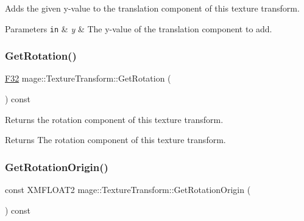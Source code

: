 Adds the given y-\/value to the translation component of this texture transform.


\begin{DoxyParams}[1]{Parameters}
\mbox{\tt in}  & {\em y} & The y-\/value of the translation component to add. \\
\hline
\end{DoxyParams}
\hypertarget{classmage_1_1_texture_transform_ade561a56fa2e80b70c74620277a9afa1}{}\label{classmage_1_1_texture_transform_ade561a56fa2e80b70c74620277a9afa1} 
\subsubsection{\texorpdfstring{Get\+Rotation()}{GetRotation()}}
{\footnotesize\ttfamily \hyperlink{namespacemage_aa97e833b45f06d60a0a9c4fc22ae02c0}{F32} mage\+::\+Texture\+Transform\+::\+Get\+Rotation (\begin{DoxyParamCaption}{ }\end{DoxyParamCaption}) const\hspace{0.3cm}{\ttfamily [noexcept]}}

Returns the rotation component of this texture transform.

\begin{DoxyReturn}{Returns}
The rotation component of this texture transform. 
\end{DoxyReturn}
\hypertarget{classmage_1_1_texture_transform_ad23596d5d9bc99978c3bc0f54c280dec}{}\label{classmage_1_1_texture_transform_ad23596d5d9bc99978c3bc0f54c280dec} 
\subsubsection{\texorpdfstring{Get\+Rotation\+Origin()}{GetRotationOrigin()}}
{\footnotesize\ttfamily const X\+M\+F\+L\+O\+A\+T2 mage\+::\+Texture\+Transform\+::\+Get\+Rotation\+Origin (\begin{DoxyParamCaption}{ }\end{DoxyParamCaption}) const\hspace{0.3cm}{\ttfamily [noexcept]}}

